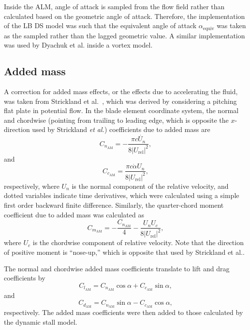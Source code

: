 \documentclass[times]{weauth}
\begin{document}
Inside the ALM, angle of attack is sampled from the flow field rather than
calculated based on the geometric angle of attack. Therefore, the implementation
of the LB DS model was such that the equivalent angle of attack
$\alpha_\mathrm{equiv}$ was taken as the sampled rather than the lagged
geometric value. A similar implementation was used by Dyachuk et al.
\cite{Dyachuk2015a} inside a vortex model.


\subsection{Added mass}

A correction for added mass effects, or the effects due to accelerating the
fluid, was taken from Strickland et al.~\cite{Strickland1981}, which was
derived by considering a pitching flat plate in potential flow. In the blade
element coordinate system, the normal and chordwise (pointing from trailing to
leading edge, which is opposite the $x$-direction used by Strickland \emph{et
    al.}) coefficients due to added mass are
\begin{equation}
    C_{n_\mathrm{AM}} = -\frac{\pi c \dot{U_n}}{8 | U_\mathrm{rel} |^2},
\end{equation}
and
\begin{equation}
    C_{c_\mathrm{AM}} = \frac{\pi c \dot{\alpha} U_n }{8 | U_\mathrm{rel} |^2},
\end{equation}
respectively, where $U_n$ is the normal component of the relative velocity, and
dotted variables indicate time derivatives, which were calculated using a simple
first order backward finite difference. Similarly, the quarter-chord moment
coefficient due to added mass was calculated as
\begin{equation}
    C_{m_\mathrm{AM}} = -\frac{C_{n_\mathrm{AM}}}{4}
        - \frac{U_n U_c}{8 | U_\mathrm{rel} |^2},
\end{equation}
where $U_c$ is the chordwise component of relative velocity. Note that the
direction of positive moment is ``nose-up,'' which is opposite that used by
Strickland et al..

The normal and chordwise added mass coefficients translate to lift and drag
coefficients by
\begin{equation}
    C_{l_\mathrm{AM}} = C_{n_\mathrm{AM}} \cos \alpha + C_{c_\mathrm{AM}} \sin
    \alpha,
\end{equation}
and
\begin{equation}
    C_{d_\mathrm{AM}} = C_{n_\mathrm{AM}} \sin \alpha - C_{c_\mathrm{AM}} \cos
    \alpha,
\end{equation}
respectively. The added mass coefficients were then added to those calculated by
the dynamic stall model.
\end{document}
